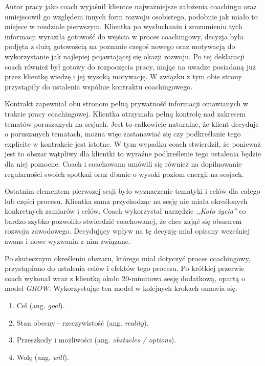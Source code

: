 Autor pracy jako coach wyjaśnił klientce najważniejsze założenia coachingu oraz umiejscowił go względem innych form rozwoju osobistego, podobnie jak miało to miejsce
w rozdziale pierwszym. Klientka po wysłuchaniu i zrozumieniu tych informacji wyraziła gotowość do wejścia w proces coachingowy, decyzja była podjęta
z dużą gotowością na poznanie czegoś nowego oraz motywacją do wykorzystanie jak najlepiej pojawiającej się okazji rozwoju. Po tej deklaracji coach również
był gotowy do rozpoczęcia pracy, mając na uwadze posiadaną już przez klientkę wiedzę i jej wysoką motywację. W związku z tym obie strony przystąpiły
do ustalenia wspólnie kontraktu coachingowego.

Kontrakt zapewniał obu stronom pełną prywatność informacji omawianych w trakcie pracy coachingowej. Klientka otrzymała pełną kontrolę nad zakresem tematów
poruszanych na sesjach. Jest to całkowicie naturalne, że klient decyduje o poruszanych tematach, można więc zastanawiać się czy podkreślanie tego explicite
w kontrakcie jest istotne. W tym wypadku coach stwierdził, że ponieważ jest to obszar wątpliwy dla klientki to wyraźne podkreślenie tego ustalenia
będzie dla niej pomocne. Coach i coachowana umówili się również na dopilnowanie regularności swoich spotkań oraz dbanie o wysoki poziom energii na sesjach.

Ostatnim elementem pierwszej sesji było wyznaczenie tematyki i celów dla całego lub części procesu. Klientka sama przychodząc na sesję nie miała określonych
konkretnych zamiarów i celów. Coach wykorzystał narzędzie \emph{,,Koło życia''} co bardzo szybko pozwoliło stwierdzić coachowanej, że chce zająć się obszarem
rozwoju zawodowego. Decydujący wpływ na tę decyzję miał opisany wcześniej awans i nowe wyzwania z nim związane.

Po skutecznym określeniu obszaru, którego miał dotyczyć proces coachingowy, przystąpiono do ustalenia celów i efektów tego procesu. Po krótkiej przerwie
coach wykonał wraz z klientką około 20-minutowa sesję dodatkową, opartą o model \emph{GROW}. Wykorzystując ten model w kolejnych krokach omawia się:
\begin{enumerate}
  \item Cel (ang. \emph{goal}).
  \item Stan obecny - rzeczywistość (ang. \emph{reality}).
  \item Przeszkody i możliwości (ang. \emph{obstacles / options}).
  \item Wolę (ang. \emph{will}).
\end{enumerate}

